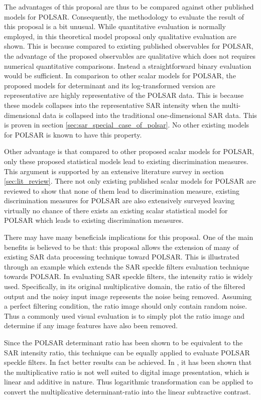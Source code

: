 \documentclass[journal]{IEEEtran}
\begin{document}
The advantages of this proposal are thus to be compared against other published models for POLSAR.
Consequently, the methodology to evaluate the result of this proposal is a bit unusual.
While quantitative evaluation is normally employed, in this theoretical model proposal only qualitative evaluation are shown.
This is because compared to existing published observables for POLSAR, the advantage of the proposed observables are qualitative which does not requires numerical quantitative comparisons.
Instead a straightforward binary evaluation would be sufficient.
In comparison to other scalar models for POLSAR, the proposed models for determinant and its log-transformed version are representative are highly representative of the POLSAR data.
This is because these models collapses into the representative SAR intensity when the multi-dimensional data is collapsed into the traditional one-dimensional SAR data.
This is proven in section \ref{sec:sar_special_case_of_polsar}.
No other existing models for POLSAR is known to have this property.

Other advantage is that compared to other proposed scalar models for POLSAR, only these proposed statistical models lead to existing discrimination measures.
This argument is supported by an extensive literature survey in section \ref{sec:lit_review}.
There not only existing published scalar models for POLSAR are reviewed to show that none of them lead to discrimination measure,
  existing discrimination measures for POLSAR are also extensively surveyed leaving virtually no chance of there exists an existing scalar statistical model for POLSAR which leads to existing discrimination measures.

There may have many beneficials implications for this proposal.
One of the main benefits is believed to be that:
  this proposal allows the extension of many of existing SAR data processing technique toward POLSAR.
This is illustrated through an example which extends the SAR speckle filters evaluation technique towards POLSAR.  
In evaluating SAR speckle filters, the intensity ratio is widely used.
Specifically, in its original multiplicative domain, the ratio of the filtered output and the noisy input image represents the noise being removed.
Assuming a perfect filtering condition, the ratio image should only contain random noise.
Thus a commonly used visual evaluation is to simply plot the ratio image and determine if any image features have also been removed.

Since the POLSAR determinant ratio has been shown to be equivalent to the SAR intensity ratio,
  this technique can be equally applied to evaluate POLSAR speckle filters.
In fact better results can be achieved.
In \cite{Medeiros_2003_IJRS}, it has been shown that the multiplicative ratio is not  well suited to digital image presentation,
  which is linear and additive in nature.
Thus logarithmic transformation can be applied to convert the multiplicative determinant-ratio into the linear subtractive contrast.  
\end{document}
